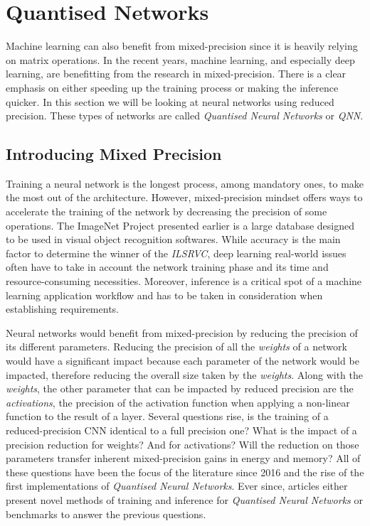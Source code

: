 \section{Quantised Networks}

Machine learning can also benefit from mixed-precision since it is heavily relying on matrix operations. In the recent years, machine learning, and especially deep learning, are benefitting from the research in mixed-precision. There is a clear emphasis on either speeding up the training process or making the inference quicker. In this section we will be looking at neural networks using reduced precision. These types of networks are called \emph{Quantised Neural Networks} or \emph{QNN}.


\subsection{Introducing Mixed Precision}

Training a neural network is the longest process, among mandatory ones, to make the most out of the architecture. However, mixed-precision mindset offers ways to accelerate the training of the network by decreasing the precision of some operations. The ImageNet Project \cite{ImageNet2009} presented earlier is a large database designed to be used in visual object recognition softwares. While accuracy is the main factor to determine the winner of the \emph{ILSRVC}, deep learning real-world issues often have to take in account the network training phase and its time and resource-consuming necessities. Moreover, inference is a critical spot of a machine learning application workflow and has to be taken in consideration when establishing requirements.

Neural networks would benefit from mixed-precision by reducing the precision of its different parameters. Reducing the precision of all the \emph{weights} of a network would have a significant impact because each parameter of the network would be impacted, therefore reducing the overall size taken by the \emph{weights}. Along with the \emph{weights}, the other parameter that can be impacted by reduced precision are the \emph{activations}, the precision of the activation function when applying a non-linear function to the result of a layer. Several questions rise, is the training of a reduced-precision CNN identical to a full precision one? What is the impact of a precision reduction for weights? And for activations? Will the reduction on those parameters transfer inherent mixed-precision gains in energy and memory? All of these questions have been the focus of the literature since 2016 and the rise of the first implementations of \emph{Quantised Neural Networks}. Ever since, articles either present novel methods of training and inference for \emph{Quantised Neural Networks} or benchmarks to answer the previous questions.

